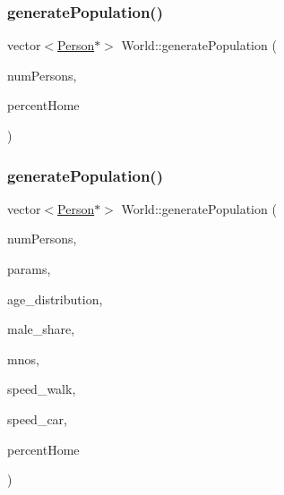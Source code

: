 \subsubsection{\texorpdfstring{generatePopulation()}{generatePopulation()}\hspace{0.1cm}{\footnotesize\ttfamily [1/2]}}
{\footnotesize\ttfamily vector$<$\mbox{\hyperlink{class_person}{Person}}$\ast$$>$ World\+::generate\+Population (\begin{DoxyParamCaption}\item[{unsigned long}]{num\+Persons,  }\item[{double}]{percent\+Home }\end{DoxyParamCaption})\hspace{0.3cm}{\ttfamily [private]}}

\mbox{\label{class_world_aa71599bf0bb4bf52e31b84a91342c6b1}} 
\subsubsection{\texorpdfstring{generatePopulation()}{generatePopulation()}\hspace{0.1cm}{\footnotesize\ttfamily [2/2]}}
{\footnotesize\ttfamily vector$<$\mbox{\hyperlink{class_person}{Person}}$\ast$$>$ World\+::generate\+Population (\begin{DoxyParamCaption}\item[{const unsigned long}]{num\+Persons,  }\item[{vector$<$ double $>$}]{params,  }\item[{\mbox{\hyperlink{class_person_a53376a9a5852ec7760488a01c37f0b0b}{Person\+::\+Age\+Distributions}}}]{age\+\_\+distribution,  }\item[{double}]{male\+\_\+share,  }\item[{vector$<$ \mbox{\hyperlink{class_mobile_operator}{Mobile\+Operator}} $\ast$ $>$}]{mnos,  }\item[{double}]{speed\+\_\+walk,  }\item[{double}]{speed\+\_\+car,  }\item[{double}]{percent\+Home }\end{DoxyParamCaption})\hspace{0.3cm}{\ttfamily [private]}}

\mbox{\label{class_world_a8cf8a54ae1f3cb61efeba2b3acebb7cc}} 
